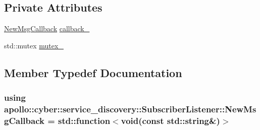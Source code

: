 \subsection*{Private Attributes}
\begin{DoxyCompactItemize}
\item 
\hyperlink{classapollo_1_1cyber_1_1service__discovery_1_1SubscriberListener_a3fa5bb4a829d0f92f13bfa2d7ef0fb57}{New\-Msg\-Callback} \hyperlink{classapollo_1_1cyber_1_1service__discovery_1_1SubscriberListener_a2027c36a05b541725ef65df62f295234}{callback\-\_\-}
\item 
std\-::mutex \hyperlink{classapollo_1_1cyber_1_1service__discovery_1_1SubscriberListener_acb4397665d28253be51deaee4631c71f}{mutex\-\_\-}
\end{DoxyCompactItemize}


\subsection{Member Typedef Documentation}
\hypertarget{classapollo_1_1cyber_1_1service__discovery_1_1SubscriberListener_a3fa5bb4a829d0f92f13bfa2d7ef0fb57}{
\subsubsection[{New\-Msg\-Callback}]{\setlength{\rightskip}{0pt plus 5cm}using {\bf apollo\-::cyber\-::service\-\_\-discovery\-::\-Subscriber\-Listener\-::\-New\-Msg\-Callback} =  std\-::function$<$void(const std\-::string\&)$>$}}\label{classapollo_1_1cyber_1_1service__discovery_1_1SubscriberListener_a3fa5bb4a829d0f92f13bfa2d7ef0fb57}


